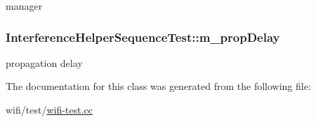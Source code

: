 manager 

\subsubsection[{\texorpdfstring{m\+\_\+prop\+Delay}{m_propDelay}}]{ Interference\+Helper\+Sequence\+Test\+::m\+\_\+prop\+Delay\hspace{0.3cm}{\ttfamily [private]}}\hypertarget{classInterferenceHelperSequenceTest_a8bb837ee5101585da2bf13247f18972e}{}\label{classInterferenceHelperSequenceTest_a8bb837ee5101585da2bf13247f18972e}


propagation delay 



The documentation for this class was generated from the following file\+:\begin{DoxyCompactItemize}
\item 
wifi/test/\hyperlink{wifi-test_8cc}{wifi-\/test.\+cc}\end{DoxyCompactItemize}
